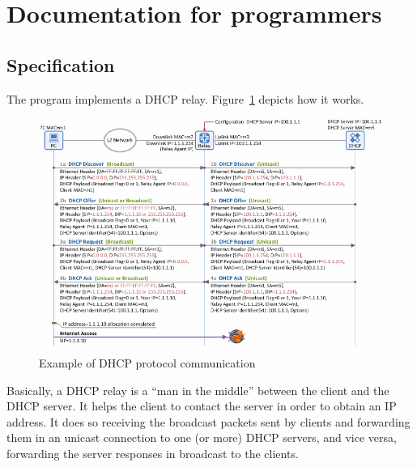 \newpage
\section{Documentation for programmers}
\subsection{Specification}
The program implements a DHCP relay. Figure~\ref{fig:dhcp} depicts how it works.
\begin{figure}[h]
	\centering\includegraphics[width=\textwidth]{images/dhcp}
	\caption{Example of DHCP protocol communication\protect\footnotemark}
	\label{fig:dhcp}
\end{figure}

Basically, a DHCP relay is a ``man in the middle'' between the client and the DHCP server. It helps the client to contact the server in order to obtain an IP address. It does so receiving the broadcast packets sent by clients and forwarding them in an unicast connection to one (or more) DHCP servers, and vice versa, forwarding the server responses in broadcast to the clients.

